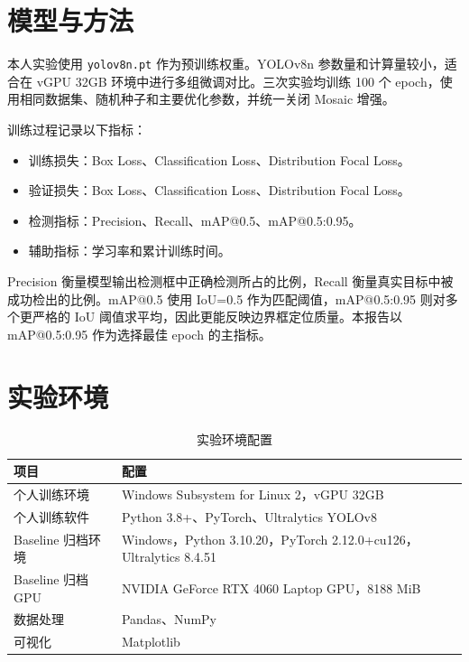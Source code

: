 \documentclass[12pt,a4paper]{ctexart}
\begin{document}
\section{模型与方法}

本人实验使用 \texttt{yolov8n.pt} 作为预训练权重。YOLOv8n 参数量和计算量较小，适合在 vGPU 32GB 环境中进行多组微调对比。三次实验均训练 100 个 epoch，使用相同数据集、随机种子和主要优化参数，并统一关闭 Mosaic 增强。

训练过程记录以下指标：

\begin{itemize}[itemsep=2pt]
    \item 训练损失：Box Loss、Classification Loss、Distribution Focal Loss。
    \item 验证损失：Box Loss、Classification Loss、Distribution Focal Loss。
    \item 检测指标：Precision、Recall、mAP@0.5、mAP@0.5:0.95。
    \item 辅助指标：学习率和累计训练时间。
\end{itemize}

Precision 衡量模型输出检测框中正确检测所占的比例，Recall 衡量真实目标中被成功检出的比例。mAP@0.5 使用 IoU=0.5 作为匹配阈值，mAP@0.5:0.95 则对多个更严格的 IoU 阈值求平均，因此更能反映边界框定位质量。本报告以 mAP@0.5:0.95 作为选择最佳 epoch 的主指标。

\section{实验环境}

\begin{table}[H]
\centering
\caption{实验环境配置}
\label{tab:env}
\begin{tabular}{p{4cm}p{10cm}}
\toprule
\textbf{项目} & \textbf{配置} \\
\midrule
个人训练环境 & Windows Subsystem for Linux 2，vGPU 32GB \\
个人训练软件& Python 3.8+、PyTorch、Ultralytics YOLOv8\\
Baseline 归档环境 & Windows，Python 3.10.20，PyTorch 2.12.0+cu126，Ultralytics 8.4.51 \\
Baseline 归档 GPU & NVIDIA GeForce RTX 4060 Laptop GPU，8188 MiB \\
数据处理      & Pandas、NumPy \\
可视化        & Matplotlib \\
\bottomrule
\end{tabular}
\end{table}
\end{document}

